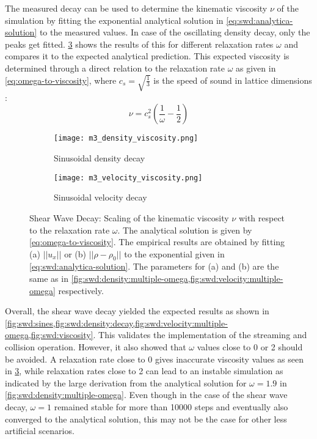 The measured decay can be used to determine the kinematic viscosity $\nu$ of the simulation by fitting the exponential analytical solution in \cref{eq:swd:analytica-solution} to the measured values. In case of the oscillating density decay, only the peaks get fitted. \cref{fig:swd:viscosity} shows the results of this for different relaxation rates $\omega$ and compares it to the expected analytical prediction. This expected viscosity is determined through a direct relation to the relaxation rate $\omega$ as given in \cref{eq:omega-to-viscosity}, where $c_s=\sqrt{\frac{1}{3}}$ is the speed of sound in lattice dimensions \cite{timm2016lattice}:
\begin{equation}
    \nu = c_s^2 \left(\frac{1}{\omega} - \frac{1}{2}\right)
    \label{eq:omega-to-viscosity}
\end{equation}

\begin{figure}[ht!]
    \begin{subfigure}{0.5\linewidth}
        \centering
        \texttt{[image: m3\_density\_viscosity.png]}
        \caption{Sinusoidal density decay}
        \label{fig:swd:density:viscosity}
    \end{subfigure}%
    \begin{subfigure}{0.5\linewidth}
        \centering
        \texttt{[image: m3\_velocity\_viscosity.png]}
        \caption{Sinusoidal velocity decay}
        \label{fig:swd:velocity:viscosity}
    \end{subfigure}
    \caption[Shear Wave Decay: Scaling of the kinematic viscosity $\nu$ with respect to the relaxation rate $\omega$]{Shear Wave Decay: Scaling of the kinematic viscosity $\nu$ with respect to the relaxation rate $\omega$. The analytical solution is given by \cref{eq:omega-to-viscosity}. The empirical results are obtained by fitting (a) $||u_x||$ or (b) $||\rho-\rho_0||$ to the exponential given in \cref{eq:swd:analytica-solution}. The parameters for (a) and (b) are the same as in \cref{fig:swd:density:multiple-omega,fig:swd:velocity:multiple-omega} respectively.}
    \label{fig:swd:viscosity}
\end{figure}

Overall, the shear wave decay yielded the expected results as shown in \cref{fig:swd:sines,fig:swd:density:decay,fig:swd:velocity:multiple-omega,fig:swd:viscosity}. This validates the implementation of the streaming and collision operation. However, it also showed that $\omega$ values close to 0 or 2 should be avoided. A relaxation rate close to 0 gives inaccurate viscosity values as seen in \cref{fig:swd:viscosity}, while relaxation rates close to 2 can lead to an instable simulation as indicated by the large derivation from the analytical solution for $\omega=1.9$ in \cref{fig:swd:density:multiple-omega}. Even though in the case of the shear wave decay, $\omega=1$ remained stable for more than 10000 steps and eventually also converged to the analytical solution, this may not be the case for other less artificial scenarios.

